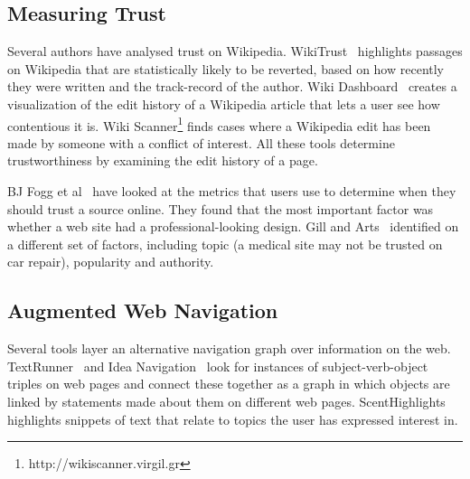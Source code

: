 \documentclass{www2010-submission}
\newcommand{\todo}[1]{}
\begin{document}
\cite{Something by Ed CHi about this}

\todo{Talk about textual entailment}

\todo{Talk about MemeTracker}


\subsection{Measuring Trust}

Several authors have analysed trust on Wikipedia. WikiTrust~\cite{Adler2008a} highlights passages on Wikipedia that are statistically likely to be reverted, based on how recently they were written and the track-record of the author. Wiki Dashboard~\cite{Kittur2008} creates a visualization of the edit history of a Wikipedia article that lets a user see how contentious it is. Wiki Scanner\footnote{http://wikiscanner.virgil.gr} finds cases where a Wikipedia edit has been made by someone with a conflict of interest. All these tools determine trustworthiness by examining the edit history of a page.

BJ Fogg et al~\cite{Fogg2000, Fogg2003} have looked at the metrics that users use to determine when they should trust a source online. They found that the most important factor was whether a web site had a professional-looking design. Gill and Arts~\cite{Gil2006} identified on a different set of factors, including topic (a medical site may not be trusted on car repair), popularity and authority.



\subsection{Augmented Web Navigation}

Several tools layer an alternative navigation graph over information on the web. TextRunner~\cite{Etzioni2008} and Idea Navigation~\cite{Etzioni2008} look for instances of subject-verb-object triples on web pages and connect these together as a graph in which objects are linked by statements made about them on different web pages. ScentHighlights~\cite{Chi2005a} highlights snippets of text that relate to topics the user has expressed interest in. 


% 
\end{document}
